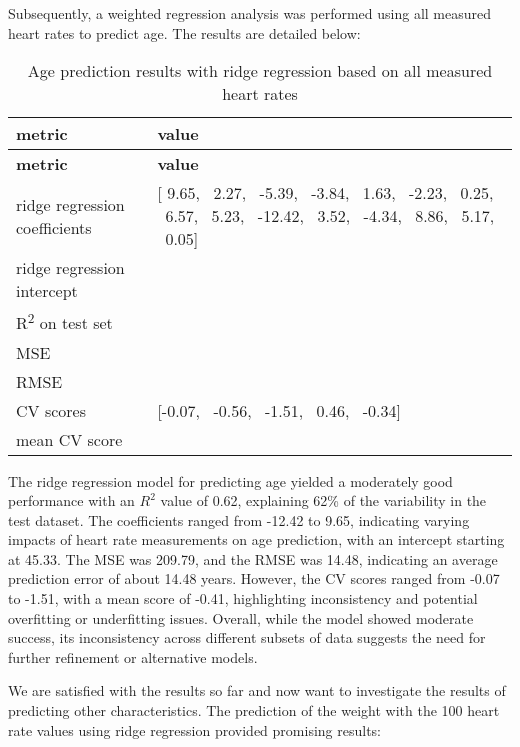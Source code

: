 Subsequently, a weighted regression analysis was performed using all measured heart rates to predict age. The results are detailed below:

\begin{table}[H]
\begin{longtable}{|>{\raggedright}p{4cm}|>{\raggedright\arraybackslash}p{10cm}|}
\hline
\textbf{metric} & \textbf{value} \\
\hline
\endfirsthead
\hline
\textbf{metric} & \textbf{value} \\
\hline
\endhead
\hline
\endfoot
ridge regression coefficients & 
\begin{minipage}[t]{10cm}
[  9.65, \   2.27, \  -5.39, \  -3.84, \   1.63, \  -2.23, \   0.25, \   6.57, \   5.23, \ -12.42, \   3.52, \  -4.34, \   8.86, \   5.17, \   0.05]
\end{minipage}
\\
\hline
ridge regression intercept & 45.33 \\
\hline
R\textsuperscript{2} on test set & 0.62 \\
\hline
MSE & 209.79 \\
\hline
RMSE & 14.48 \\
\hline
CV scores & 
\begin{minipage}[t]{10cm}
[-0.07, \ -0.56, \ -1.51, \  0.46, \ -0.34]
\end{minipage}
\\
\hline
mean CV score & -0.41 \\
\hline
\end{longtable}
\caption{Age prediction results with ridge regression based on all measured heart rates}
\label{tab:RRAgeallheart}
\end{table}

The ridge regression model for predicting age yielded a moderately good performance with an \( R^2 \) value of 0.62, explaining 62\% of the variability in the test dataset. The coefficients ranged from -12.42 to 9.65, indicating varying impacts of heart rate measurements on age prediction, with an intercept starting at 45.33. The MSE was 209.79, and the RMSE was 14.48, indicating an average prediction error of about 14.48 years. However, the CV scores ranged from -0.07 to -1.51, with a mean score of -0.41, highlighting inconsistency and potential overfitting or underfitting issues. Overall, while the model showed moderate success, its inconsistency across different subsets of data suggests the need for further refinement or alternative models.

We are satisfied with the results so far and now want to investigate the results of predicting other characteristics. The prediction of the weight with the 100 heart rate values using ridge regression provided promising results:

